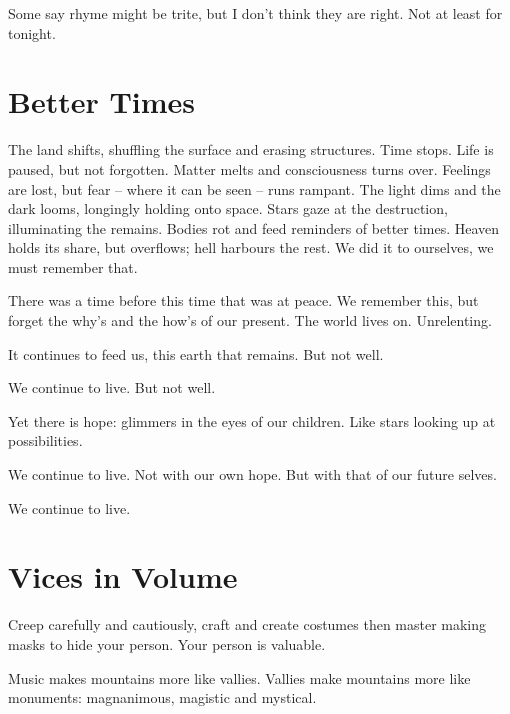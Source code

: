 \documentclass[fontsize=12pt,english]{scrreprt}
\begin{document}
Some say rhyme might be trite, but I don’t think they are right. Not
at least for tonight.

\newpage

\section{Better Times}


The land shifts, shuffling the surface and erasing structures. Time
stops. Life is paused, but not forgotten. Matter melts and
consciousness turns over. Feelings are lost, but fear -- where it can
be seen -- runs rampant. The light dims and the dark looms, longingly
holding onto space. Stars gaze at the destruction, illuminating the
remains. Bodies rot and feed reminders of better times. Heaven holds
its share, but overflows; hell harbours the rest. We did it to
ourselves, we must remember that.

There was a time before this time that was at peace. We remember this,
but forget the why's and the how's of our present. The world lives
on. Unrelenting.

It continues to feed us, this earth that remains. But not well.

We continue to live. But not well.

Yet there is hope: glimmers in the eyes of our children. Like stars
looking up at possibilities.

We continue to live. Not with our own hope. But with that of our
future selves.

We continue to live.

\newpage

\section{Vices in Volume}


Creep carefully and cautiously, craft and create costumes then master
making masks to hide your person. Your person is valuable.



Music makes mountains more like vallies. Vallies make mountains more
like monuments: magnanimous, magistic and mystical.
\end{document}
